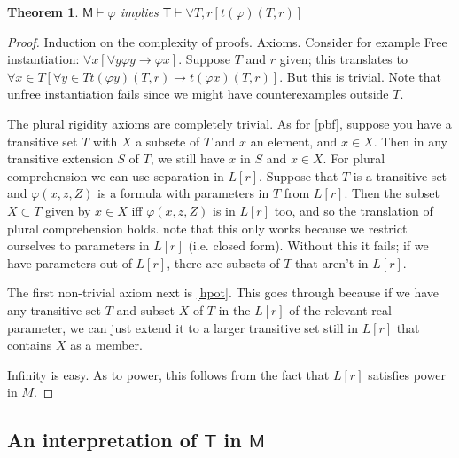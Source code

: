 \documentclass{article}
\newtheorem{Theorem}{Theorem}[section]
\theoremstyle{definition}
\begin{document}
\begin{Theorem}
  $\mathsf{M} \vdash \varphi$ implies $\mathsf{T} \vdash \forall T,r[ t(\varphi)(T, r)]$  
\end{Theorem}
\begin{proof}
    Induction on the complexity of proofs. Axioms. Consider for example 
    Free instantiation: $\forall x[\forall y \varphi y \rightarrow \varphi x]$.
    Suppose $T$ and $r$ given; this translates to $\forall x \in T [ \forall y \in T t(\varphi y)(T, r) \rightarrow t(\varphi x) (T, r)]$.
    But this is trivial. Note that unfree instantiation fails since we might have counterexamples 
    outside $T$.

    The plural rigidity axioms are completely trivial. As for \eqref{pbf},
    suppose you have a transitive set $T$ with $X$ a subsete of $T$ and $x$ an element, 
    and $x \in X$. Then in any transitive extension $S$ of $T$, we still have $x$ in $S$ and $x \in X$.
    For plural comprehension 
    we can use separation in $L[r]$. Suppose that $T$ is a transitive set and 
    $\varphi(x, z, Z)$ is a formula with parameters in $T$ from $L[r]$. Then the subset
    $X \subset T$ given by $x \in X$ iff $\varphi(x, z, Z)$ is in $L[r]$ too, and so 
    the translation of plural comprehension holds. note that this only works because we restrict ourselves 
    to parameters in $L[r]$ (i.e. closed form). Without this it fails; if we have parameters 
    out of $L[r]$, there are subsets of $T$ that aren't in $L[r]$.

    The first non-trivial axiom next is \eqref{hpot}. This goes through because 
    if we have any transitive set $T$ and subset $X$ of $T$ in the $L[r]$ of the relevant real parameter,
    we can just extend it to a larger transitive set still in $L[r]$ that contains $X$ as a member.

    Infinity is easy. As to power, this follows from the fact that $L[r]$ satisfies power in $M$.
    

\end{proof}


\subsection{An interpretation of $\mathsf{T}$ in $\mathsf{M}$}
\end{document}
